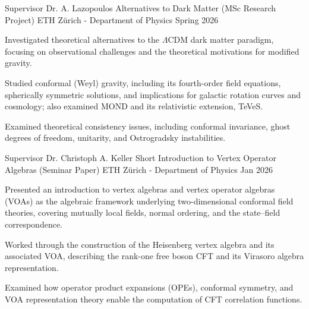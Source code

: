 \begin{cventries}

  \cventry
  {Supervisor Dr. A. Lazopoulos} %
  {Alternatives to Dark Matter (MSc Research Project)} %
  {ETH Zürich - Department of Physics} %
  {Spring 2026} %
  {
    \begin{cvitems} %
      \item {Investigated theoretical alternatives to the $\Lambda$CDM dark matter paradigm, focusing on observational challenges and the theoretical motivations for modified gravity.}
      \item {Studied conformal (Weyl) gravity, including its fourth-order field equations, spherically symmetric solutions, and implications for galactic rotation curves and cosmology; also examined MOND and its relativistic extension, TeVeS.}
      \item {Examined theoretical consistency issues, including conformal invariance, ghost degrees of freedom, unitarity, and Ostrogradsky instabilities.}
    \end{cvitems}
  }

  \cventry
  {Supervisor Dr. Christoph A. Keller} %
  {Short Introduction to Vertex Operator Algebras (Seminar Paper)} %
  {ETH Zürich - Department of Physics} %
  {Jan 2026} %
  {
    \begin{cvitems} %
      \item {Presented an introduction to vertex algebras and vertex operator algebras (VOAs) as the algebraic framework underlying two-dimensional conformal field theories, covering mutually local fields, normal ordering, and the state--field correspondence.}
      \item {Worked through the construction of the Heisenberg vertex algebra and its associated VOA, describing the rank-one free boson CFT and its Virasoro algebra representation.}
      \item {Examined how operator product expansions (OPEs), conformal symmetry, and VOA representation theory enable the computation of CFT correlation functions.}
    \end{cvitems}
  }


\end{cventries}
